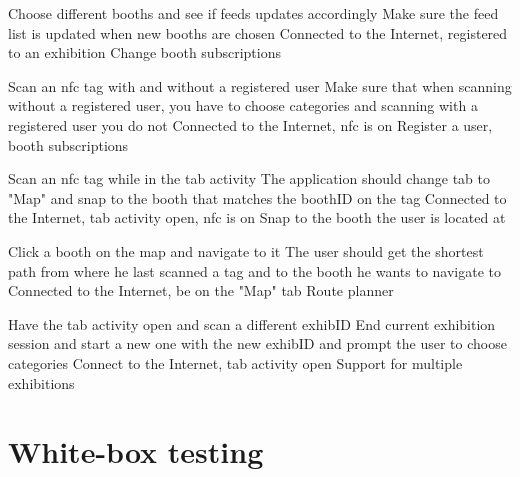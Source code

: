 \testcase
{Choose different booths and see if feeds updates accordingly}
{Make sure the feed list is updated when new booths are chosen}
{Connected to the Internet, registered to an exhibition}
{Change booth subscriptions}


\testcase
{Scan an \ac{nfc} tag with and without a registered user}
{Make sure that when scanning without a registered user, you have to choose categories and scanning with a registered user you do not}
{Connected to the Internet, \ac{nfc} is on}
{Register a user, booth subscriptions}

\testcase
{Scan an \ac{nfc} tag while in the tab activity}
{The application should change tab to "Map" and snap to the booth that matches the boothID on the tag}
{Connected to the Internet,  tab activity open, \ac{nfc} is on}
{Snap to the booth the user is located at}

\testcase
{Click a booth on the map and navigate to it}
{The user should get the shortest path from where he last scanned a tag and to the booth he wants to navigate to}
{Connected to the Internet, be on the "Map" tab}
{Route planner}

\testcase
{Have the tab activity open and scan a different exhibID}
{End current exhibition session and start a new one with the new exhibID and prompt the user to choose categories}
{Connect to the Internet, tab activity open}
{Support for multiple exhibitions}

\section{White-box testing}

